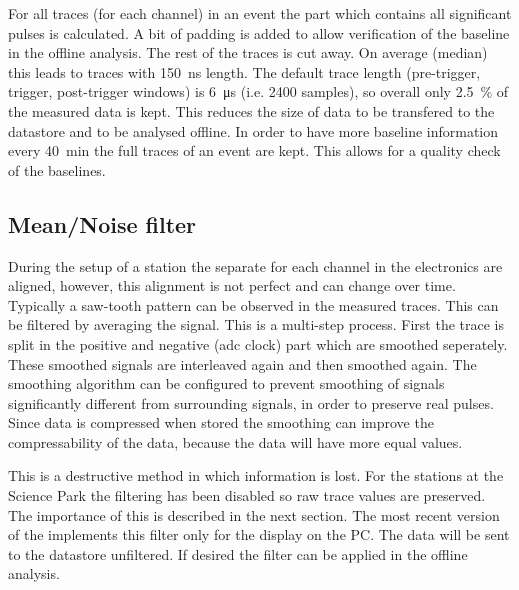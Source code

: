 \cite{oostenbrugge2014}

For all traces (for each channel) in an event the part which contains all significant pulses is calculated. A bit of padding is added to allow verification of the baseline in the offline analysis. The rest of the traces is cut away. On average (median) this leads to traces with \SI{150}{\nano\second} length. The default trace length (pre-trigger, trigger, post-trigger windows) is \SI{6}{\micro\second} (i.e. 2400 samples), so overall only \SI{2.5}{\percent} of the measured data is kept. This reduces the size of data to be transfered to the datastore and to be analysed offline. In order to have more baseline information every \SI{40}{\minute} the full traces of an event are kept. This allows for a quality check of the baselines.



\subsection{Mean/Noise filter}

During the setup of a station the separate \adcs for each channel in the \hisparc electronics are aligned, however, this alignment is not perfect and can change over time. Typically a saw-tooth pattern can be observed in the measured traces. This can be filtered by averaging the signal. This is a multi-step process. First the trace is split in the positive and negative (adc clock) part which are smoothed seperately. These smoothed signals are interleaved again and then smoothed again. The smoothing algorithm can be configured to prevent smoothing of signals significantly different from surrounding signals, in order to preserve real pulses. Since data is compressed when stored the smoothing can improve the compressability of the data, because the data will have more equal values.

This is a destructive method in which information is lost. For the \hisparc stations at the Science Park the filtering has been disabled so raw trace values are preserved. The importance of this is described in the next section. The most recent version of the \hisparc \daq [to be released] implements this filter only for the display on the \hisparc PC. The data will be sent to the datastore unfiltered. If desired the filter can be applied in the offline analysis.

